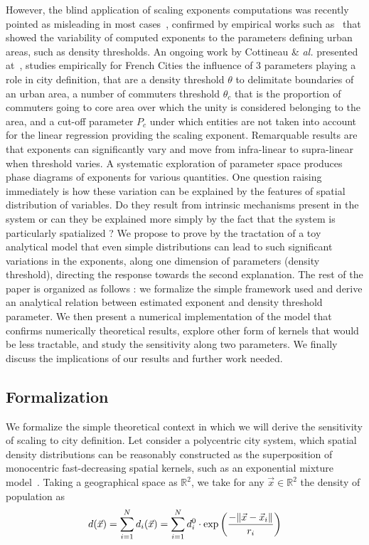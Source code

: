 However, the blind application of scaling exponents computations was recently pointed as misleading in most cases~\cite{louf2014scaling}, confirmed by empirical works such as~\cite{2013arXiv1301.1674A} that showed the variability of computed exponents to the parameters defining urban areas, such as density thresholds. An ongoing work by Cottineau \& \textit{al.} presented at~\cite{cottineau2015scaling}, studies empirically for French Cities the influence of 3 parameters playing a role in city definition, that are a density threshold $\theta$ to delimitate boundaries of an urban area, a number of commuters threshold $\theta_c$ that is the proportion of commuters going to core area over which the unity is considered belonging to the area, and a cut-off parameter $P_c$ under which entities are not taken into account for the linear regression providing the scaling exponent. Remarquable results are that exponents can significantly vary and move from infra-linear to supra-linear when threshold varies. A systematic exploration of parameter space produces phase diagrams of exponents for various quantities. One question raising immediately is how these variation can be explained by the features of spatial distribution of variables. Do they result from intrinsic mechanisms present in the system or can they be explained more simply by the fact that the system is particularly spatialized ? We propose to prove by the tractation of a toy analytical model that even simple distributions can lead to such significant variations in the exponents, along one dimension of parameters (density threshold), directing the response towards the second explanation. The rest of the paper is organized as follows : we formalize the simple framework used and derive an analytical relation between estimated exponent and density threshold parameter. We then present a numerical implementation of the model that confirms numerically theoretical results, explore other form of kernels that would be less tractable, and study the sensitivity along two parameters. We finally discuss the implications of our results and further work needed.

\subsection{Formalization}
\label{sec:formalization}

We formalize the simple theoretical context in which we will derive the sensitivity of scaling to city definition. Let consider a polycentric city system, which spatial density distributions can be reasonably constructed as the superposition of monocentric fast-decreasing spatial kernels, such as an exponential mixture model~\cite{anas1998urban}. Taking a geographical space as $\mathbb{R}^2$, we take for any $\vec{x}\in\mathbb{R}^2$ the density of population as
\begin{equation}
d(\vec{x}) = \sum_{i=1}^{N}{d_i(\vec{x})} = \sum_{i=1}^{N}{d_i^0\cdot \exp{\left(\frac{-\| \vec{x}-\vec{x}_i \|}{r_i}\right)}}
\end{equation}


